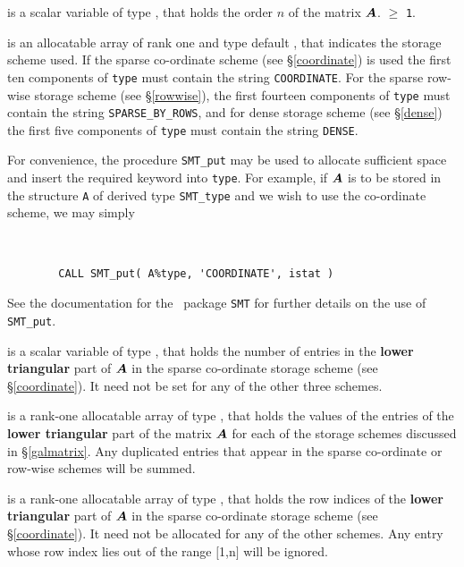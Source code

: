\documentclass{galahad}
\begin{document}
\begin{description}

 is a scalar variable of type \integer, that holds
the order $n$ of the matrix  ${\bm{A}}$.
 $\geq$ {\tt 1}.

 is an allocatable array of rank one and type default \character, that
indicates the storage scheme used. If the
sparse co-ordinate scheme (see \S\ref{coordinate}) is used
the first ten components of {\tt type} must contain the
string {\tt COORDINATE}.
For the sparse row-wise storage scheme (see \S\ref{rowwise}),
the first fourteen components of {\tt type} must contain the
string {\tt SPARSE\_BY\_ROWS}, and
for dense storage scheme (see \S\ref{dense})
the first five components of {\tt type} must contain the
string {\tt DENSE}.

For convenience, the procedure {\tt SMT\_put}
may be used to allocate sufficient space and insert the required keyword
into {\tt type}.
For example, if ${\bm{A}}$ is to be stored in the structure {\tt A}
of derived type {\tt SMT\_type} and we wish to use
the co-ordinate scheme, we may simply
{\tt
\begin{verbatim}
        CALL SMT_put( A%type, 'COORDINATE', istat )
\end{verbatim}
}
\noindent
See the documentation for the \galahad\ package {\tt SMT}
for further details on the use of {\tt SMT\_put}.

 is a scalar variable of type \integer, that
holds the number of entries in the {\bf lower triangular} part of ${\bm{A}}$
in the sparse co-ordinate storage scheme (see \S\ref{coordinate}).
It need not be set for any of the other three schemes.

 is a rank-one allocatable array of type \realdp, that holds
the values of the entries of the {\bf lower triangular} part
of the matrix ${\bm{A}}$ for each of the
storage schemes discussed in \S\ref{galmatrix}.
Any duplicated entries that appear in the sparse
co-ordinate or row-wise schemes will be summed.

 is a rank-one allocatable array of type \integer,
that holds the row indices of the {\bf lower triangular} part of ${\bm{A}}$
in the sparse co-ordinate storage
scheme (see \S\ref{coordinate}).
It need not be allocated for any of the other schemes.
Any entry whose row index lies out of the range $[$1,n$]$ will be ignored.


\end{description}
\end{document}
